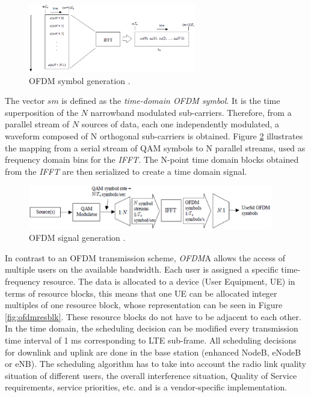 \begin{figure}[htbp]
    \centering
    \includegraphics[width=0.65\textwidth]{./figures/ofdm_symbol_gen}
    \caption{ OFDM symbol generation \cite{umtslte}.
    \label{fig:ofdmsymbol}}
\end{figure}

The vector $sm$ is defined as the \emph{time-domain OFDM symbol}. It is the time
superposition of the $N$ narrowband modulated sub-carriers. Therefore, from a
parallel stream of $N$ sources of data, each one independently modulated, a
waveform composed of N orthogonal sub-carriers is obtained. Figure
\ref{fig:ofdmchain} illustrates the mapping from a serial stream of QAM symbols
to N parallel streams, used as frequency domain bins for the \textit{IFFT}. The
N-point time domain blocks obtained from the \textit{IFFT} are then serialized
to create a time domain signal.

\begin{figure}[htbp]
    \centering
    \includegraphics[width=0.95\textwidth]{./figures/ofdm_signal_chain}
    \caption{ OFDM signal generation \cite{umtslte}.
    \label{fig:ofdmchain}}
\end{figure}

In contrast to an OFDM transmission scheme, \textit{OFDM}A allows the access of
multiple users on the available bandwidth. Each user is assigned a specific
time-frequency resource. The data is allocated to a device (User Equipment, UE)
in terms of resource blocks, this means that one UE can be allocated integer
multiples of one resource block, whose representation can be seen in Figure
\ref{fig:ofdmresblk}. These resource blocks do not have to be adjacent to each
other. In the time domain, the scheduling decision can be modified every
transmission time interval of 1 ms corresponding to LTE sub-frame. All scheduling
decisions for downlink and uplink are done in the base station (enhanced NodeB,
eNodeB or eNB). The scheduling algorithm has to take into account the radio link
quality situation of different users, the overall interference situation,
Quality of Service requirements, service priorities, etc. and is a
vendor-specific implementation.

